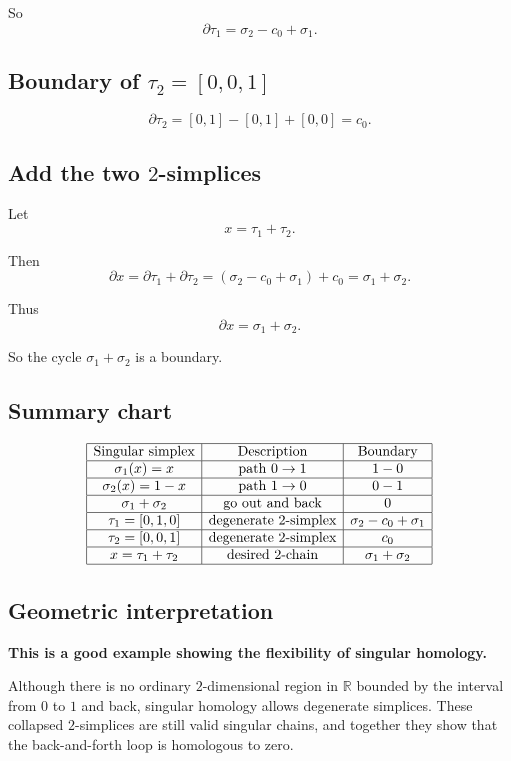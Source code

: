 \documentclass[12pt,a4paper]{article}
\theoremstyle{notespace}
\begin{document}
So
\[
\partial\tau_1=\sigma_2-c_0+\sigma_1.
\]

\subsection{Boundary of \(\tau_2=[0,0,1]\)}

\[
\partial\tau_2
=
[0,1]-[0,1]+[0,0]
=
c_0.
\]

\subsection{Add the two \(2\)-simplices}

Let
\[
x=\tau_1+\tau_2.
\]

Then
\[
\partial x
=
\partial\tau_1+\partial\tau_2
=
(\sigma_2-c_0+\sigma_1)+c_0
=
\sigma_1+\sigma_2.
\]

Thus
\[
\boxed{\partial x=\sigma_1+\sigma_2.}
\]

So the cycle \(\sigma_1+\sigma_2\) is a boundary.

\subsection{Summary chart}

\[
\begin{array}{|c|c|c|}
	\hline
	\text{Singular simplex} & \text{Description} & \text{Boundary} \\
	\hline
	\sigma_1(x)=x & \text{path }0\to1 & 1-0 \\
	\hline
	\sigma_2(x)=1-x & \text{path }1\to0 & 0-1 \\
	\hline
	\sigma_1+\sigma_2 & \text{go out and back} & 0 \\
	\hline
	\tau_1=[0,1,0] & \text{degenerate }2\text{-simplex} & \sigma_2-c_0+\sigma_1 \\
	\hline
	\tau_2=[0,0,1] & \text{degenerate }2\text{-simplex} & c_0 \\
	\hline
	x=\tau_1+\tau_2 & \text{desired }2\text{-chain} & \sigma_1+\sigma_2 \\
	\hline
\end{array}
\]

\subsection{Geometric interpretation}

\textbf{This is a good example showing the flexibility of singular homology.}

Although there is no ordinary \(2\)-dimensional region in \(\mathbb{R}\) bounded by the interval from \(0\) to \(1\) and back, singular homology allows degenerate simplices. These collapsed \(2\)-simplices are still valid singular chains, and together they show that the back-and-forth loop is homologous to zero.
\end{document}
